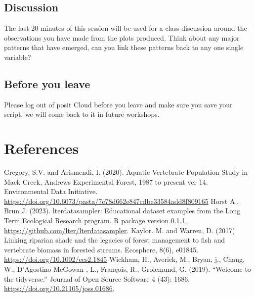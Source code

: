 \documentclass[
]{book}
\begin{document}
\hypertarget{discussion}{%
\section{Discussion}\label{discussion}}

The last 20 minutes of this session will be used for a class discussion around the observations you have made from the plots produced. Think about any major patterns that have emerged, can you link these patterns back to any one single variable?

\hypertarget{before-you-leave}{%
\section{Before you leave}\label{before-you-leave}}

Please log out of posit Cloud before you leave and make sure you save your script, we will come back to it in future workshops.

\hypertarget{references}{%
\chapter{References}\label{references}}

Gregory, S.V. and Arismendi, I. (2020). Aquatic Vertebrate Population Study in Mack Creek, Andrews Experimental Forest, 1987 to present ver 14. Environmental Data Initiative. \url{https://doi.org/10.6073/pasta/7c78d662e847cdbe33584add8f809165}
Horst A., Brun J. (2023). lterdatasampler: Educational dataset examples from the Long Term Ecological Research program. R package version 0.1.1, \url{https://github.com/lter/lterdatasampler}.
Kaylor. M. and Warren, D. (2017) Linking riparian shade and the legacies of forest management to fish and vertebrate biomass in forested streams. Ecosphere, 8(6), e01845. \url{https://doi.org/10.1002/ecs2.1845}
Wickham, H., Averick, M., Bryan, j., Chang, W., D'Agostino McGowan , L., François, R., Grolemund, G. (2019). ``Welcome to the tidyverse.'' Journal of Open Source Software 4 (43): 1686. \url{https://doi.org/10.21105/joss.01686}.
\end{document}
